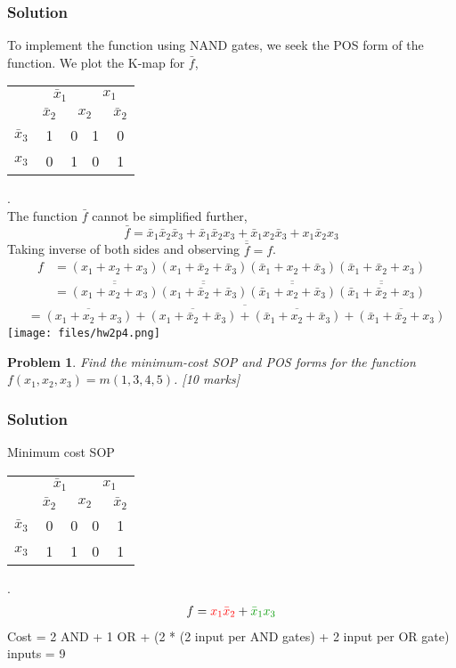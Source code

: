 \documentclass{article}
\newtheorem{prob}{Problem}
\newcommand{\bx}{\bar{x}}
\newcommand{\cred}{\color{red}}
\newcommand{\cg}{\color{green!60!black}}
\begin{document}
\subsubsection*{Solution}
To implement the function using NAND gates, we seek the POS form of the
function. We plot the K-map for $\bar{f}$,
\\
\begin{tabular}{c|c|c|c|c}
  \toprule
  & \multicolumn{2}{c|}{$\bx_1$} & \multicolumn{2}{c}{$x_1$}
  \\
  & $\bx_2$ & \multicolumn{2}{c|}{$x_2$} & $\bx_2$
  \\ \midrule
  $\bx_3$
  & 1 & 0 & 1 & 0
  \\
  $x_3$
  & 0 & 1 & 0 & 1
  \\\bottomrule
\end{tabular}.
\\
The function $\bar{f}$ cannot be simplified further,
\[
  \bar{f} = \bx_1 \bx_2 \bx_3  + \bx_1 \bx_2 x_3  + \bx_1 x_2 \bx_3 + x_1 \bx_2 x_3
\]
Taking inverse of both sides and observing $\overline{\bar{f}} = f$.
{\tiny
\begin{align*}
  f &= (x_1 + x_2 + x_3)(x_1 + \bx_2 + \bx_3)(\bx_1 + x_2 + \bx_3)(\bx_1 + \bx_2 + x_3)
      \\
    &=\overline{\overline{(x_1 + x_2 + x_3)}}\overline{\overline{(x_1 + \bx_2 + \bx_3)}}\overline{\overline{(\bx_1 + x_2 + \bx_3)}}\overline{\overline{(\bx_1 + \bx_2 + x_3)}}
      \end{align*}
}{\tiny
\begin{align*}
  &=\overline{\overline{{(x_1 + x_2 + x_3)}} + {\overline{(x_1 + \bx_2 + \bx_3)}}
  + {\overline{(\bx_1 + x_2 + \bx_3)}} + {\overline{(\bx_1 + \bx_2 + x_3)}}}
\end{align*}
}
\texttt{[image: files/hw2p4.png]}


\begin{prob}
Find the minimum-cost SOP and POS forms for the function $f(x_1 , x_2 , x_3 ) =
m(1, 3, 4, 5)$. \cite[Prob 2.37]{brown2013fundamentals} [10 marks]
\label{prob:237}
\end{prob}

\subsubsection*{Solution}

Minimum cost SOP
\\
\begin{tabular}{c|c|c|c|c}
  \toprule
  & \multicolumn{2}{c|}{$\bx_1$} & \multicolumn{2}{c}{$x_1$}
  \\
  & $\bx_2$ & \multicolumn{2}{c|}{$x_2$} & $\bx_2$
  \\ \midrule
  $\bx_3$
  & 0 & 0 & 0 & {\color{red}1}
  \\
  $x_3$
  & {\color{green}1} & {\color{green}1} & 0 & {\color{red}1}
  \\\bottomrule
\end{tabular}.
\\
\begin{align}
  f = {\cred x_1 \bx_2} + {\cg \bx_1 x_3}
\end{align}
Cost = 2 AND  + 1 OR + (2 * (2 input per AND gates) + 2 input per OR gate) inputs = 9
\end{document}
